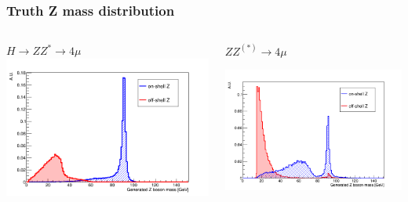 \documentclass{beamer}
\begin{document}
\begin{frame}
\frametitle{Truth Z mass distribution}

\begin{columns}
\begin{column}{.5\textwidth}
\centering
$H \rightarrow ZZ^* \rightarrow 4\mu$
\includegraphics[width=\textwidth]{HZZ4mu/genZMass}
\end{column}
\begin{column}{.5\textwidth}
\centering
$ZZ^{(*)} \rightarrow 4\mu$\par
\includegraphics[width=\textwidth]{ZZ4mu/genZMass}
\end{column}
\end{columns}
\end{frame}

\end{document}

